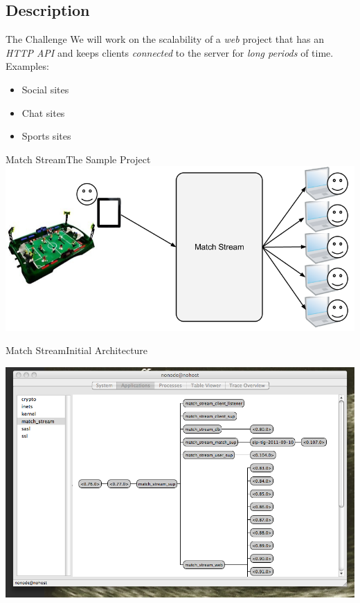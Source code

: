 \documentclass[utf8]{beamer}
\begin{document}
\subsection{Description}
\begin{frame}{The Challenge}
	We will work on the scalability of a \emph{web} project \pause that has an \emph{HTTP API} \pause and keeps clients \emph{connected} to the server \pause for \emph{long periods} of time.\\
\pause Examples:
	\begin{itemize}
		\item Social sites
		\item Chat sites
		\item Sports sites
	\end{itemize}
\end{frame}
\begin{frame}[t]{Match Stream}{The Sample Project}
	\includegraphics[top=-1,width=\textwidth]{img/MatchStream.png}
\end{frame}
\begin{frame}{Match Stream}{Initial Architecture}
	\begin{center}
		\includegraphics[height=.75\textheight]{img/running.png}
	\end{center}
\end{frame}
\end{document}
